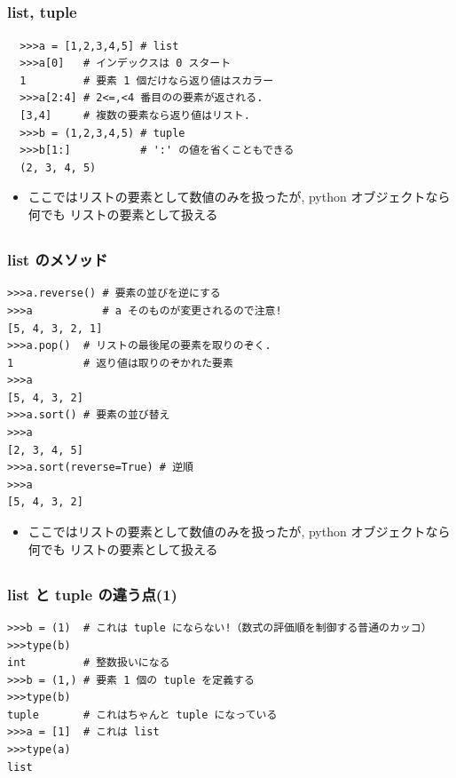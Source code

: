 \subsection*{\redm\whiteb\greenb}
\begin{frame}[t,fragile]
 \frametitle{list, tuple}
 \begin{lstlisting}
  >>>a = [1,2,3,4,5] # list
  >>>a[0]   # インデックスは 0 スタート
  1         # 要素 1 個だけなら返り値はスカラー
  >>>a[2:4] # 2<=,<4 番目のの要素が返される. 
  [3,4]     # 複数の要素なら返り値はリスト. 
  >>>b = (1,2,3,4,5) # tuple
  >>>b[1:]           # ':' の値を省くこともできる
  (2, 3, 4, 5)
 \end{lstlisting}
 \begin{itemize}
  \item ここではリストの要素として数値のみを扱ったが, python オブジェクトなら何でも リストの要素として扱える
 \end{itemize}
\end{frame}

\subsection*{\redm\whitem\greenb}
\begin{frame}[t,fragile]
\frametitle{list のメソッド}
\begin{lstlisting}
>>>a.reverse() # 要素の並びを逆にする
>>>a           # a そのものが変更されるので注意!
[5, 4, 3, 2, 1]
>>>a.pop()  # リストの最後尾の要素を取りのぞく.
1           # 返り値は取りのぞかれた要素
>>>a
[5, 4, 3, 2]
>>>a.sort() # 要素の並び替え
>>>a
[2, 3, 4, 5]
>>>a.sort(reverse=True) # 逆順
>>>a
[5, 4, 3, 2]
\end{lstlisting}
\begin{itemize}
\item ここではリストの要素として数値のみを扱ったが, python オブジェクトなら何でも リストの要素として扱える
\end{itemize}
\end{frame}

\subsection*{\redm\whitem\greenb}
\begin{frame}[t,fragile]
\frametitle{list と tuple の違う点(1)}
\begin{lstlisting}
>>>b = (1)  # これは tuple にならない!（数式の評価順を制御する普通のカッコ）
>>>type(b)
int         # 整数扱いになる
>>>b = (1,) # 要素 1 個の tuple を定義する
>>>type(b)
tuple       # これはちゃんと tuple になっている
>>>a = [1]  # これは list
>>>type(a)
list
\end{lstlisting}
\end{frame}


